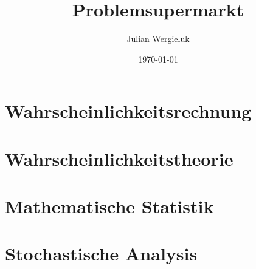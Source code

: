 \documentclass[11pt,oldfontcommands,twoside,a4paper]{memoir}
\title{Problemsupermarkt}\author{Julian Wergieluk}\date{\today}
\begin{document}
\pagestyle{headings}

\frontmatter
\maketitle
\cleartorecto

\setcounter{tocdepth}{3}
\tableofcontents

\mainmatter

\setcounter{secnumdepth}{4}
\renewcommand{\theenumi}{(\alph{enumi})}
\renewcommand{\labelenumi}{\theenumi}



\chapter{Wahrscheinlichkeitsrechnung}


\chapter{Wahrscheinlichkeitstheorie}


\chapter{Mathematische Statistik}


\chapter{Stochastische Analysis}


\backmatter

\printbibliography
%
%
\end{document}

